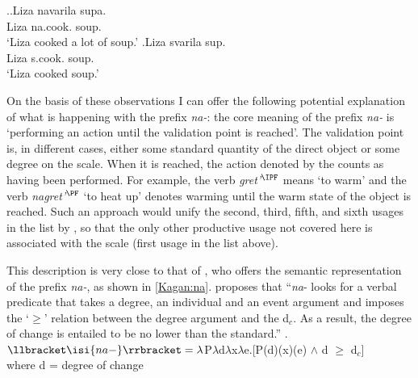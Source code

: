 \ex.\ag.\label{ex:navarit}Liza navarila supa.\\
Liza na.cook. soup.\\
\trans `Liza cooked a lot of soup.'
\bg.\label{ex:svarit}Liza svarila sup.\\
Liza s.cook. soup.\\
\trans `Liza cooked soup.'

On the basis of these observations I can offer the following potential explanation of what is happening with the prefix \textit{na-}: the core meaning of the  prefix \textit{na-} is `performing an action until the validation point is reached'. The validation point is, in different cases, either some standard quantity of the direct object or some degree on the scale. When it is reached, the action denoted by the  counts as having been performed. For example, the verb \textit{gret'}$^{\IPF}$ means `to warm' and the verb \textit{nagret'}$^{\PF}$ `to heat up' denotes warming until the warm state of the object is reached. Such an approach would unify the second, third, fifth, and sixth usages in the list by \citet{Shvedova:82}, so that the only other productive usage not covered here is associated with the  scale (first usage in the list above). 

This description is very close to that of \citet{Kagan:book}, who offers the semantic representation of the prefix \textit{na-}, as shown in \ref{Kagan:na}. \citet[55]{Kagan:book} proposes that ``\textit{na}- looks for a verbal predicate that takes a degree, an individual and an event argument and imposes the `$\geqslant$' relation between the degree argument and the   d$_c$. As a result, the degree of change is entailed to be no lower than the standard.''
\ex.\label{Kagan:na}$\llbracket \isi{na-} \rrbracket = \lambda$P$\lambda$d$\lambda$x$\lambda$e.[P(d)(x)(e) $\wedge$ d $\geqslant$ d$_c$]\\
where d = degree of change \citep{KennedyLevin:02}\\

